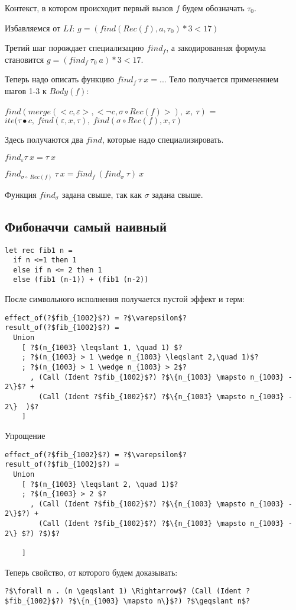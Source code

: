 \documentclass{article}
\begin{document}
Контекст, в котором происходит первый вызов $f$ будем обозначать $\tau_0$.

Избавляемся от $LI$: $g = (find(Rec(f), a, \tau_0)*3 < 17)$

Третий шаг порождает специализацию $find_f$, а закодированная формула становится 
$g = (find_f\ \tau_0\ a)*3 < 17$.

Теперь надо описать функцию $find_f\ \tau\ x = ... $ Тело получается применением шагов 1-3 к $Body(f)$: 

\begin{center}
$find( merge(<c,\varepsilon>, <\neg c, \sigma \circ Rec(f)>),\ x,\ \tau)$ = 
 $ite(\tau\bullet c,\ find(\varepsilon,x,\tau),\ find(\sigma\circ Rec(f),x,\tau)$
\end{center}
Здесь получаются два $find$, которые надо специализировать.

$find_{\varepsilon} \tau\ x = \tau\ x$

$find_{\sigma\circ\ Rec(f)}\ \tau\ x = find_{f}\ (find_{\sigma}\ \tau)\ x$

Функция $find_\sigma$ задана свыше, так как $\sigma$ задана свыше.

\subsection{Фибоначчи самый наивный}
\begin{verbatim}  
let rec fib1 n = 
  if n <=1 then 1
  else if n <= 2 then 1
  else (fib1 (n-1)) + (fib1 (n-2))
\end{verbatim}

После символьного исполнения получается пустой эффект и терм:
\begin{verbatim}
effect_of(?$fib_{1002}$?) = ?$\varepsilon$?
result_of(?$fib_{1002}$?) = 
  Union 
    [ ?$(n_{1003} \leqslant 1, \quad 1) $?
    ; ?$(n_{1003} > 1 \wedge n_{1003} \leqslant 2,\quad 1)$?
    ; ?$(n_{1003} > 1 \wedge n_{1003} > 2$?
      , (Call (Ident ?$fib_{1002}$?) ?$\{n_{1003} \mapsto n_{1003} - 2\}$? +
        (Call (Ident ?$fib_{1002}$?) ?$\{n_{1003} \mapsto n_{1003} - 2\}  )$?   
    ]
\end{verbatim}
Упрощение
\begin{verbatim}
effect_of(?$fib_{1002}$?) = ?$\varepsilon$?
result_of(?$fib_{1002}$?) = 
  Union 
    [ ?$(n_{1003} \leqslant 2, \quad 1)$?
    ; ?$(n_{1003} > 2 $?
      , (Call (Ident ?$fib_{1002}$?) ?$\{n_{1003} \mapsto n_{1003} - 2\}$?) +
        (Call (Ident ?$fib_{1002}$?) ?$\{n_{1003} \mapsto n_{1003} - 2\} $?) ?$)$?

    ]
\end{verbatim}
Теперь свойство, от которого будем доказывать: 
\begin{verbatim}
?$\forall n . (n \geqslant 1) \Rightarrow$? (Call (Ident ?$fib_{1002}$?) ?$\{n_{1003} \mapsto n\}$?) ?$\geqslant n$?
\end{verbatim}
\end{document}

